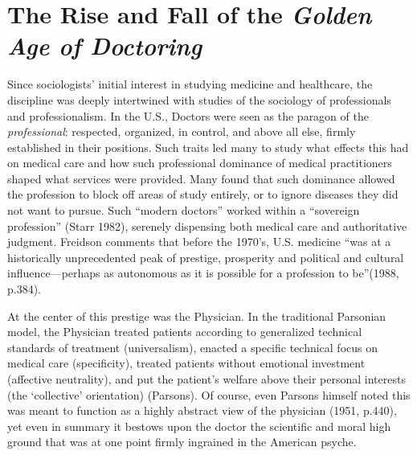 \documentclass[12pt,twoside]{reedthesis}
\begin{document}
  \section*{The Rise and Fall of the \emph{Golden Age of
  Doctoring}}\label{the-rise-and-fall-of-the-golden-age-of-doctoring}
  
  Since sociologists' initial interest in studying medicine and
  healthcare, the discipline was deeply intertwined with studies of the
  sociology of professionals and professionalism. In the U.S., Doctors
  were seen as the paragon of the \emph{professional}: respected,
  organized, in control, and above all else, firmly established in their
  positions. Such traits led many to study what effects this had on
  medical care and how such professional dominance of medical
  practitioners shaped what services were provided. Many found that such
  dominance allowed the profession to block off areas of study entirely,
  or to ignore diseases they did not want to pursue. Such ``modern
  doctors'' worked within a ``sovereign profession'' (Starr 1982),
  serenely dispensing both medical care and authoritative judgment.
  Freidson comments that before the 1970's, U.S. medicine ``was at a
  historically unprecedented peak of prestige, prosperity and political
  and cultural influence---perhaps as autonomous as it is possible for a
  profession to be''(1988, p.384).
  
  At the center of this prestige was the Physician. In the traditional
  Parsonian model, the Physician treated patients according to generalized
  technical standards of treatment (universalism), enacted a specific
  technical focus on medical care (specificity), treated patients without
  emotional investment (affective neutrality), and put the patient's
  welfare above their personal interests (the `collective' orientation)
  (Parsons). Of course, even Parsons himself noted this was meant to
  function as a highly abstract view of the physician (1951, p.440), yet
  even in summary it bestows upon the doctor the scientific and moral high
  ground that was at one point firmly ingrained in the American psyche.
  
\end{document}
